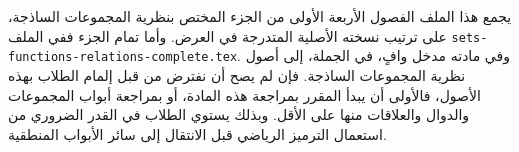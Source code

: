\documentclass[../../include/open-logic-part]{subfiles}
\begin{document}

\begin{editorial}
  يجمع هذا الملف الفصول الأربعة الأولى من الجزء المختص بنظرية المجموعات
  الساذجة، على ترتيب نسخته الأصلية المتدرجة في العرض. وأما تمام الجزء
  ففي الملف \verb|sets-functions-relations-complete.tex|. وفي مادته مدخل
  وافٍ، في الجملة، إلى أصول نظرية المجموعات الساذجة. فإن لم يصح أن نفترض
  من قبل إلمام الطلاب بهذه الأصول، فالأولى أن يبدأ المقرر بمراجعة هذه
  المادة، أو بمراجعة أبواب المجموعات والدوال والعلاقات منها على الأقل.
  وبذلك يستوي الطلاب في القدر الضروري من استعمال الترميز الرياضي قبل
  الانتقال إلى سائر الأبواب المنطقية.
\end{editorial}





\OLEndPartHook
\end{document}
